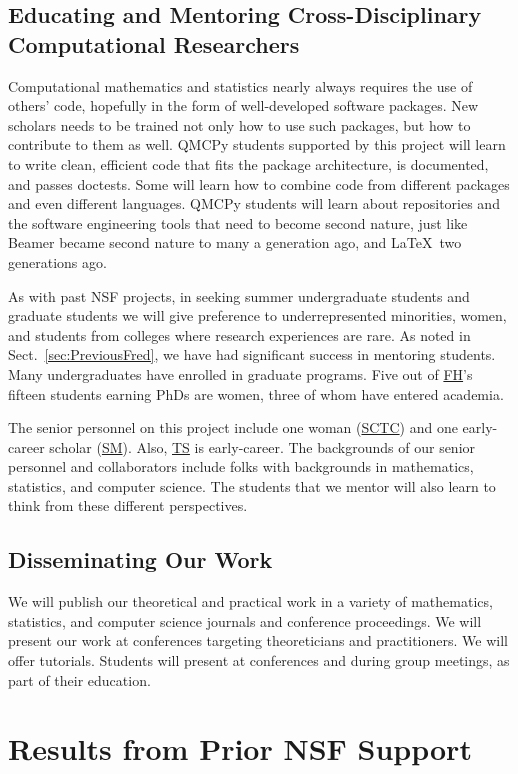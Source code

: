 \documentclass[11pt]{NSFamsart}
\newcommand{\FH}{\hyperlink{FHlink}{FH}\xspace}
\newcommand{\SM}{\hyperlink{SMlink}{SM}\xspace}
\newcommand{\SCTC}{\hyperlink{SCTClink}{SCTC}\xspace}
\newcommand{\TS}{\hyperlink{TSlink}{TS}\xspace}
\begin{document}
\subsection{Educating and Mentoring Cross-Disciplinary Computational Researchers}
Computational mathematics and statistics nearly always requires the use of others' code, hopefully in the form of well-developed software packages.  New scholars needs to be trained not only how to use such packages, but how to contribute to them as well.  QMCPy students supported by this project will learn to write clean, efficient code that fits the package architecture, is documented, and passes doctests.  Some will learn how to combine code from different packages and even different languages.  QMCPy students will learn about repositories and the software engineering tools that need to become second nature, just like Beamer became second nature to many a generation ago, and \LaTeX\ two generations ago.

As with past NSF projects, in seeking summer undergraduate students and graduate students we will give preference to underrepresented minorities, women, and students from colleges where research experiences are rare.  As noted in Sect.\ \ref{sec:PreviousFred}, we have had significant success in mentoring students.  Many undergraduates have enrolled in graduate programs.  Five out of \FH's fifteen students earning PhDs are women, three of whom have entered academia.

The senior personnel on this project include one woman (\SCTC) and one early-career scholar (\SM).  Also, \TS is early-career.  The backgrounds of our senior personnel and collaborators include folks with backgrounds in mathematics, statistics, and computer science.  The students  that we mentor will also learn to think from these different perspectives.

\subsection{Disseminating Our Work} We will publish our theoretical and practical work in a variety of mathematics, statistics, and computer science journals and conference proceedings. We will present our work at conferences targeting theoreticians and practitioners.  We will offer tutorials.  Students will present at conferences and during group meetings, as part of their education.



\section{Results from Prior NSF Support} \label{sec:prior_work}
\end{document}
